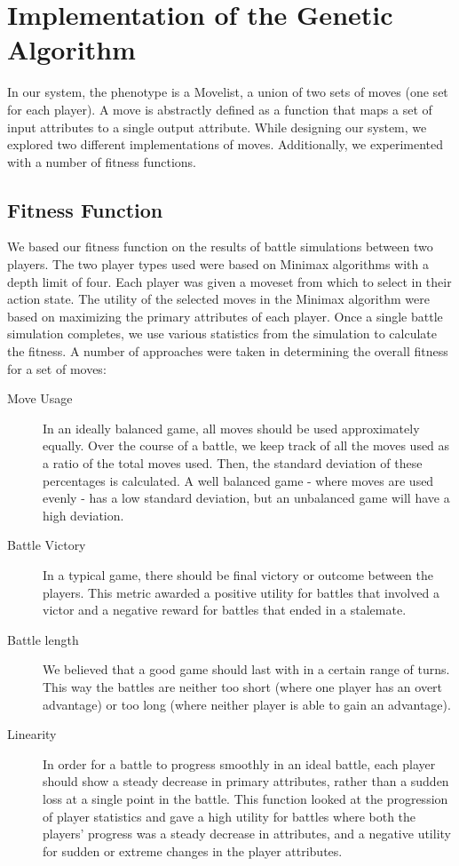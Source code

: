 \documentclass{acm_proc_article-sp}
\begin{document}
\section{Implementation of the Genetic Algorithm}

In our system, the phenotype is a Movelist, a union of two sets of moves (one set for each player). A move is abstractly defined as a function that maps a set of input attributes to a single output attribute. While designing our system, we explored two different implementations of moves. Additionally, we experimented with a number of fitness functions.

\subsection{Fitness Function}

We based our fitness function on the results of battle simulations between two players.  The two player types used were based on Minimax algorithms with a depth limit of four. Each player was given a moveset from which to select in their action state. The utility of the selected moves in the Minimax algorithm were based on maximizing the primary attributes of each player.
Once a single battle simulation completes, we use various statistics from the simulation to calculate the fitness. A number of approaches were taken in determining the overall fitness for a set of moves:

\begin{description}
    \item[Move Usage] In an ideally balanced game, all moves should be used approximately equally. Over the course of a battle, we keep track of all the moves used as a ratio of the total moves used. Then, the standard deviation of these percentages is calculated. A well balanced game - where moves are used evenly - has a low standard deviation, but an unbalanced game will have a high deviation.
    \item[Battle Victory] In a typical game, there should be final victory or outcome between the players. This metric awarded a positive utility for battles that involved a victor and a negative reward for battles that ended in a stalemate.
    \item[Battle length] We believed that a good game should last with in a certain range of turns. This way the battles are neither too short (where one player has an overt advantage) or too long (where neither player is able to gain an advantage). 
    \item[Linearity] In order for a battle to progress smoothly in an ideal battle, each player should show a steady decrease in primary attributes, rather than a sudden loss at a single point in the battle. This function looked at the progression of player statistics and gave a high utility for battles where both the players’ progress was a steady decrease in attributes, and a negative utility for sudden or extreme changes in the player attributes.
\end{description}
\end{document}
